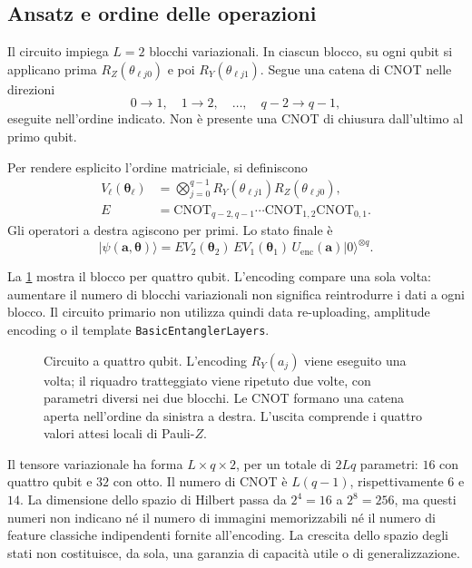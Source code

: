\subsection{Ansatz e ordine delle operazioni}

Il circuito impiega \(L=2\) blocchi variazionali. In ciascun blocco,
su ogni qubit si applicano prima \(R_Z(\theta_{\ell j0})\) e poi
\(R_Y(\theta_{\ell j1})\). Segue una catena di CNOT nelle direzioni
\[
  0\longrightarrow1,\quad1\longrightarrow2,\quad\ldots,\quad
  q-2\longrightarrow q-1,
\]
eseguite nell'ordine indicato. Non è presente una CNOT di chiusura
dall'ultimo al primo qubit.

Per rendere esplicito l'ordine matriciale, si definiscono
\begin{align}
 V_\ell(\boldsymbol\theta_\ell)
   &=\bigotimes_{j=0}^{q-1}
       R_Y(\theta_{\ell j1})R_Z(\theta_{\ell j0}),\\
 E&=\mathrm{CNOT}_{q-2,q-1}\cdots
       \mathrm{CNOT}_{1,2}\mathrm{CNOT}_{0,1}.
\end{align}
Gli operatori a destra agiscono per primi. Lo stato finale è
\begin{equation}
 \lvert\psi(\boldsymbol a,\boldsymbol\theta)\rangle
 =E V_2(\boldsymbol\theta_2)\,
  E V_1(\boldsymbol\theta_1)\,
  U_{\mathrm{enc}}(\boldsymbol a)\lvert0\rangle^{\otimes q}.
 \label{eq:stato-finale}
\end{equation}

La \cref{fig:circuito-q4} mostra il blocco per quattro qubit.
L'encoding compare una sola volta: aumentare il numero di blocchi
variazionali non significa reintrodurre i dati a ogni blocco.
Il circuito primario non utilizza quindi data re-uploading, amplitude
encoding o il template \texttt{BasicEntanglerLayers}.

\begin{figure}[tbp]
\centering

\caption{Circuito a quattro qubit. L'encoding \(R_Y(a_j)\) viene
eseguito una volta; il riquadro tratteggiato viene ripetuto due volte,
con parametri diversi nei due blocchi. Le CNOT formano una catena
aperta nell'ordine da sinistra a destra. L'uscita comprende i quattro
valori attesi locali di Pauli-\(Z\).}
\label{fig:circuito-q4}
\end{figure}

Il tensore variazionale ha forma \(L\times q\times2\), per un totale
di \(2Lq\) parametri: \(16\) con quattro qubit e \(32\) con otto.
Il numero di CNOT è \(L(q-1)\), rispettivamente \(6\) e \(14\).
La dimensione dello spazio di Hilbert passa da \(2^4=16\) a
\(2^8=256\), ma questi numeri non indicano né il numero di immagini
memorizzabili né il numero di feature classiche indipendenti fornite
all'encoding. La crescita dello spazio degli stati non costituisce,
da sola, una garanzia di capacità utile o di generalizzazione.

